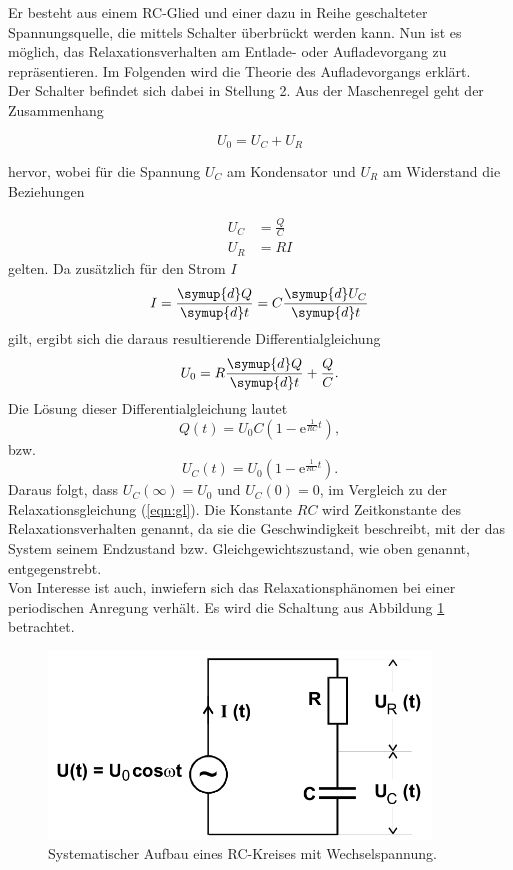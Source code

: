 Er besteht aus einem RC-Glied und einer dazu in Reihe geschalteter Spannungsquelle, die mittels Schalter überbrückt werden kann.
Nun ist es möglich, das Relaxationsverhalten am Entlade- oder Aufladevorgang zu repräsentieren.
Im Folgenden wird die Theorie des Aufladevorgangs erklärt.\\
Der Schalter befindet sich dabei in Stellung 2.
Aus der Maschenregel geht der Zusammenhang

\begin{equation}
  U_0 = U_C + U_R \label{eqn:1}
\end{equation}

hervor, wobei für die Spannung $U_C$ am Kondensator und $U_R$ am Widerstand die Beziehungen

\begin{align*}
  U_C &= \frac{Q}{C}\\
  U_R &= RI
\end{align*}
gelten.
Da zusätzlich für den Strom $I$
\begin{equation}
  I = \frac{\symup{d} Q}{\symup{d} t} = C\frac{\symup{d} U_C}{\symup{d} t} \label{eqn:2}
\end{equation}
gilt, ergibt sich die daraus resultierende Differentialgleichung
\begin{equation}
  U_0 = R\frac{\symup{d} Q}{\symup{d} t} + \frac{Q}{C}.
\end{equation}
Die Lösung dieser Differentialgleichung lautet
\begin{equation}
  Q(t) = U_0C(1-\mathrm{e}^{\frac{1}{RC}t}),
\end{equation}
bzw.
\begin{equation}
  U_C(t) = U_0(1-\mathrm{e}^{\frac{1}{RC}t}). \label{eqn:gl2}
\end{equation}
Daraus folgt, dass $U_C(\infty) = U_0$ und $U_C(0) = 0$, im Vergleich zu der Relaxationsgleichung (\ref{eqn:gl}).
Die Konstante $RC$ wird Zeitkonstante des Relaxationsverhalten genannt, da sie die Geschwindigkeit beschreibt, mit der das System seinem Endzustand bzw. Gleichgewichtszustand, wie oben genannt, entgegenstrebt.\\
Von Interesse ist auch, inwiefern sich das Relaxationsphänomen bei einer periodischen Anregung verhält.
Es wird die Schaltung aus Abbildung \ref{fig:2} betrachtet.

\begin{figure}[H]
  \centering
  \includegraphics[height=5cm]{kreis2.png}
  \caption{Systematischer Aufbau eines RC-Kreises mit Wechselspannung. \cite{sample}}
  \label{fig:2}
\end{figure}

